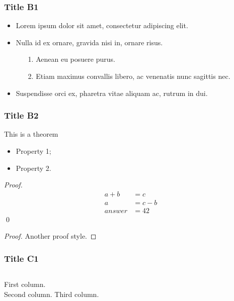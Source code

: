 \documentclass{beamer}
\begin{document}
\begin{frame}
\frametitle{Title B1}

\begin{itemize}
\addtolength{\itemsep}{.2cm}
\item Lorem ipsum dolor sit amet, consectetur adipiscing elit.
\item Nulla id ex ornare, gravida nisi in, ornare risus.
  \begin{itemize}
    \addtolength{\itemsep}{.1cm}
  \item[1.] Aenean eu posuere purus.
  \item[2.] Etiam maximus convallis libero, ac venenatis nunc sagittis nec.
  \end{itemize}
\item Suspendisse orci ex, pharetra vitae aliquam ac, rutrum in dui.
\end{itemize}

\end{frame}


\begin{frame}
\frametitle{Title B2}

\begin{theorem}[Th. Name]
\label{thlabel} This is a theorem
\begin{itemize}
\item Property 1;
\item Property 2.
\end{itemize}
\end{theorem}

\pause

\textit{Proof. }
\begin{align}
    a + b & = c \\
    a & = c - b \\
    answer & = 42
\end{align}
\qed

\pause

\begin{proof}
Another proof style.
\end{proof}

\end{frame}


\begin{frame}
\frametitle{Title C1}

\begin{columns}[t, onlytextwidth]
First column.\\
\pause{}
Second column.
\pause
{}
Third column.
\end{columns}

\end{frame}
\end{document}
